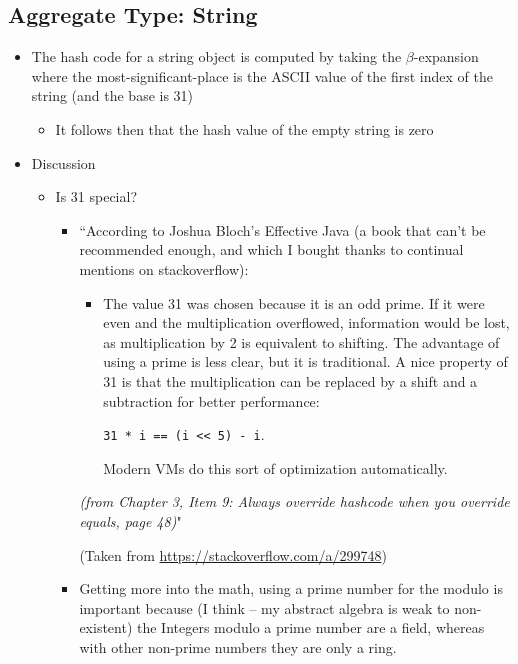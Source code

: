 \documentclass[10pt]{article}
\begin{document}
\subsection*{Aggregate Type: String}
\begin{itemize}
    \item The hash code for a string object is computed by taking the $\beta$-expansion where the most-significant-place is the ASCII value of the first index of the string (and the base is 31)
    \begin{itemize}
        \item It follows then that the hash value of the empty string is zero
    \end{itemize}
    \item Discussion
    \begin{itemize}
        \item Is 31 special?
        \begin{itemize}
            \item ``According to Joshua Bloch's Effective Java (a book that can't be recommended enough, and which I bought thanks to continual mentions on stackoverflow):
            
            \begin{itemize}
                \item[] The value 31 was chosen because it is an odd prime. If it were even and the multiplication overflowed, information would be lost, as multiplication by 2 is equivalent to shifting. The advantage of using a prime is less clear, but it is traditional. A nice property of 31 is that the multiplication can be replaced by a shift and a subtraction for better performance:
            
                \texttt{31 * i == (i << 5) - i}.
            
                Modern VMs do this sort of optimization automatically.
            \end{itemize}
            
            \textit{(from Chapter 3, Item 9: Always override hashcode when you override equals, page 48)}"

            (Taken from \url{https://stackoverflow.com/a/299748}) 
            
            \item Getting more into the math, using a prime number for the modulo is important because (I think -- my abstract algebra is weak to non-existent) the Integers modulo a prime number are a field, whereas with other non-prime numbers they are only a ring.
            

\end{itemize}
\end{itemize}
\end{itemize}
\end{document}
